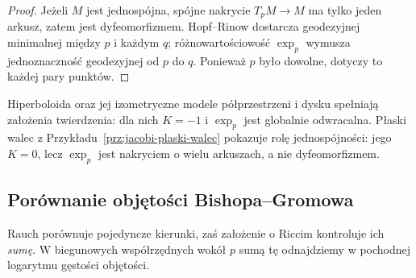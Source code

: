 \begin{proof}
Jeżeli $M$ jest jednospójna, spójne nakrycie
$T_pM\to M$ ma tylko jeden arkusz, zatem
jest dyfeomorfizmem. Hopf--Rinow dostarcza
geodezyjnej minimalnej między $p$ i każdym $q$;
różnowartościowość $\exp_p$ wymusza
jednoznaczność geodezyjnej od $p$ do $q$.
Ponieważ $p$ było dowolne, dotyczy to każdej
pary punktów.
\end{proof}

Hiperboloida oraz jej izometryczne modele
półprzestrzeni i dysku spełniają założenia
twierdzenia: dla nich $K=-1$ i $\exp_p$
jest globalnie odwracalna. Płaski walec
z Przykładu~\ref{prz:jacobi-plaski-walec}
pokazuje rolę jednospójności: jego $K=0$,
lecz $\exp_p$ jest nakryciem o wielu arkuszach,
a nie dyfeomorfizmem.

\subsection*{Porównanie objętości Bishopa--Gromowa}

Rauch porównuje pojedyncze kierunki, zaś
założenie o Riccim kontroluje ich \emph{sumę}.
W biegunowych współrzędnych wokół $p$
sumą tę odnajdziemy w pochodnej logarytmu
gęstości objętości.

